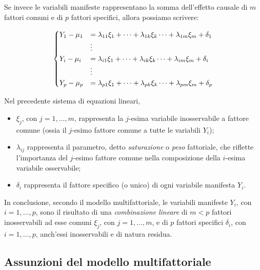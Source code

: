 \documentclass[
  11pt,
]{krantz}
\providecommand{\tightlist}{%
  \setlength{\itemsep}{0pt}\setlength{\parskip}{0pt}}
\theoremstyle{definition}
\theoremstyle{definition}
\theoremstyle{definition}
\theoremstyle{definition}
\theoremstyle{remark}
\begin{document}
Se invece le variabili manifeste rappresentano la somma dell'effetto causale di \(m\) fattori comuni e di \(p\) fattori specifici, allora possiamo scrivere:

\begin{equation}
\begin{cases} 
  Y_1  - \mu_1  &= \lambda_{11}\xi_1 + \dots + \lambda_{1k}\xi_k \dots +\lambda_{1m}\xi_m + \delta_1 \\
&\vdots\\
Y_i -  \mu_i  &= \lambda_{i1}\xi_1 + \dots +  \lambda_{ik}\xi_k \dots +\lambda_{im}\xi_m + \delta_i\\
&\vdots\\
Y_p - \mu_p  &= \lambda_{p1}\xi_1 + \dots +  \lambda_{pk}\xi_k \dots +\lambda_{pm}\xi_m + \delta_p \notag
\end{cases}
\end{equation}

Nel precedente sistema di equazioni lineari,

\begin{itemize}
\tightlist
\item
  \(\xi_j\), con \(j=1, \dots, m\), rappresenta la \(j\)-esima variabile inosservabile a fattore comune (ossia il \(j\)-esimo fattore comune a tutte le variabili \(Y_i\));
\item
  \(\lambda_{ij}\) rappresenta il parametro, detto \emph{saturazione} o \emph{peso} fattoriale, che riflette l'importanza del \(j\)-esimo fattore comune nella composizione della \(i\)-esima variabile osservabile;
\item
  \(\delta_i\) rappresenta il fattore specifico (o unico) di ogni variabile manifesta \(Y_i\).
\end{itemize}

In conclusione, secondo il modello multifattoriale, le variabili manifeste \(Y_i\), con \(i=1, \dots, p\), sono il risultato di una \emph{combinazione lineare} di \(m < p\) fattori inosservabili ad esse comuni \(\xi_j\), con \(j=1, \dots, m\), e di \(p\) fattori specifici \(\delta_i\), con \(i=1, \dots, p\), anch'essi inosservabili e di natura residua.

\hypertarget{assunzioni-del-modello-multifattoriale}{%
\subsection{Assunzioni del modello multifattoriale}\label{assunzioni-del-modello-multifattoriale}}
\end{document}
